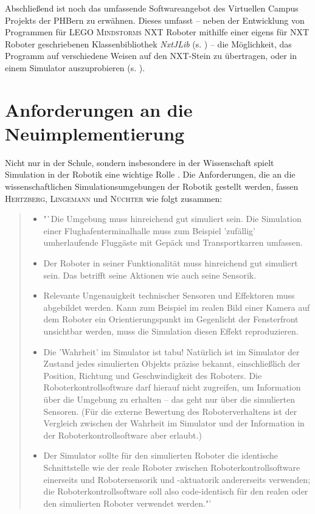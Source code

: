 \documentclass[paper=a4, DIV=calc, BCOR=12mm, twoside=on, onecolumn=on, open = right, titlepage =on, parskip =half-, headsepline = on, footsepline = off, chapterprefix = off, appendixprefix = on, fontsize = 12pt, numbers = noenddot, abstract = on]{scrbook}
\begin{document}
Abschließend ist noch das umfassende Softwareangebot des Virtuellen Campus Projekts der PHBern zu erwähnen. Dieses umfasst -- neben der Entwicklung von Programmen für \textsc{LEGO Mindstorms} NXT Roboter mithilfe einer eigens für NXT Roboter geschriebenen Klassenbibliothek \emph{NxtJLib} (s. \cite{aegidius:16}) -- die Möglichkeit, das Programm auf verschiedene Weisen auf den NXT-Stein zu übertragen, oder in einem Simulator auszuprobieren (s. \cite{phbern}). 

\par \singlespacing
\chapter{Anforderungen an die Neu\-im\-ple\-men\-tie\-rung}
\label{chap:anforderungen}
\onehalfspacing
Nicht nur in der Schule, sondern insbesondere in der Wissenschaft spielt Simulation in der Robotik eine wichtige Rolle \cite[S.13]{hertzberg:12}. Die Anforderungen, die an die wissenschaftlichen Simulationsumgebungen der Robotik gestellt werden, fassen \textsc{Hertzberg, Lingemann} und \textsc{Nüchter} wie folgt zusammen:
\begin{quote}
\begin{itemize}
\item "`Die Umgebung muss hinreichend gut simuliert sein. Die Simulation einer Flughafenterminalhalle muss zum Beispiel 'zufällig' umherlaufende Fluggäste mit Gepäck und Transportkarren umfassen.

\item Der Roboter in seiner Funktionalität muss hinreichend gut simuliert sein. Das betrifft seine Aktionen wie auch seine Sensorik.

\item Relevante Ungenauigkeit technischer Sensoren und Effektoren muss abgebildet werden. Kann zum Beispiel im realen Bild einer Kamera auf dem Roboter ein Orientierungspunkt im Gegenlicht der Fensterfront unsichtbar werden, muss die Simulation diesen Effekt reproduzieren.

\item Die 'Wahrheit' im Simulator ist tabu! Natürlich ist im Simulator der Zustand jedes simulierten Objekts präzise bekannt, einschließlich der Position, Richtung und Geschwindigkeit des Roboters. Die Roboterkontrollsoftware darf hierauf nicht zugreifen, um Information über die Umgebung zu erhalten -- das geht nur über die simulierten Sensoren. (Für die externe Bewertung des Roboterverhaltens ist der Vergleich zwischen der Wahrheit im Simulator und der Information in der Roboterkontrollsoftware aber erlaubt.)

\item Der Simulator sollte für den simulierten Roboter die identische Schnittstelle wie der reale Roboter zwischen Roboterkontrollsoftware einerseits und Robotersensorik und -ak\-tu\-ato\-rik andererseits verwenden; die Roboterkontrollsoftware soll also code-identisch für den realen oder den simulierten Roboter verwendet werden."' \cite[S.14]{hertzberg:12} 
\end{itemize}
\end{quote}
\end{document}
